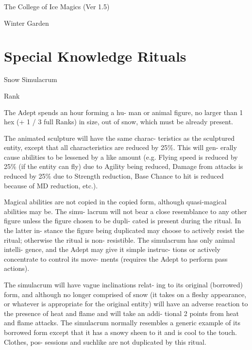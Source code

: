 \begin{Chapter}{The College of Ice Magics (Ver 1.5)}
\begin{spell}[S-17]{Winter Garden }
\begin{effects}
\end{effects}
\end{spell}

\section{Special Knowledge Rituals}

\begin{ritual}[R-1]{Snow Simulacrum }

Rank 
\begin{effects}
 The  Adept  spends  an  hour  forming  a  hu-
man or animal figure, no larger than 1 hex (+ 1 / 3 
full  Ranks)  in  size,  out  of  snow,  which  must  be 
already present.  

The animated sculpture will have the same charac-
teristics  as  the  sculptured  entity,  except  that  all 
characteristics are  reduced  by  25\%. This  will  gen-
erally  cause  abilities  to  be  lessened  by  a  like 
amount  (e.g.  Flying  speed  is  reduced  by  25\%  (if 
the  entity  can  fly)  due  to  Agility  being  reduced, 
Damage  from  attacks  is  reduced  by  25\%  due  to 
Strength  reduction,  Base  Chance  to  hit  is  reduced 
because of MD reduction, etc.).  

Magical abilities are not copied in the copied form, 
although quasi-magical abilities may be. The simu-
lacrum  will  not  bear  a  close  resemblance  to  any 
other  figure  unless  the  figure  chosen  to  be  dupli-
cated  is  present  during  the  ritual.  In  the  latter  in-
stance  the  figure  being  duplicated  may  choose  to 
actively resist the ritual; otherwise the ritual is non-
resistible.  The  simulacrum has  only  animal  intelli-
gence,  and  the  Adept  may  give  it  simple  instruc-
tions  or  actively  concentrate  to  control  its  move-
ments (requires the Adept to perform pass actions).  

The simulacrum will have vague inclinations relat-
ing  to  its  original  (borrowed)  form,  and  although 
no  longer  comprised  of  snow  (it  takes  on  a  fleshy 
appearance,  or  whatever  is  appropriate  for  the 
original entity) will have an adverse reaction to the 
presence  of  heat  and  flame  and  will  take  an  addi-
tional  2  points  from  heat  and  flame  attacks.  The 
simulacrum normally resembles a generic example 
of  its  borrowed  form  except  that  it  has  a  snowy 
sheen  to  it  and  is  cool  to  the  touch.  Clothes,  pos-
sessions  and  suchlike  are  not  duplicated  by  this 
ritual.  


\end{effects}
\end{ritual}
\end{Chapter}

